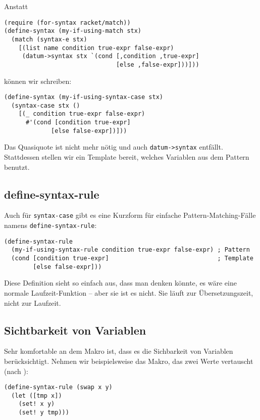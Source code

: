 Anstatt

\begin{lstlisting}
(require (for-syntax racket/match))
(define-syntax (my-if-using-match stx)
  (match (syntax-e stx)
    [(list name condition true-expr false-expr)
     (datum->syntax stx `(cond [,condition ,true-expr]
                               [else ,false-expr]))]))
\end{lstlisting}

können wir schreiben:

\begin{lstlisting}
(define-syntax (my-if-using-syntax-case stx)
  (syntax-case stx ()
    [(_ condition true-expr false-expr)
      #'(cond [condition true-expr]
             [else false-expr])]))
\end{lstlisting}

Das Quasiquote ist nicht mehr nötig und auch \texttt{datum->syntax} entfällt. Stattdessen stellen wir ein Template bereit, welches Variablen aus dem Pattern benutzt. 

\subsection{define-syntax-rule}

Auch für \texttt{syntax-case} gibt es eine Kurzform für einfache Pattern-Matching-Fälle namens \texttt{define-syntax-rule}:

\begin{lstlisting}
(define-syntax-rule 
  (my-if-using-syntax-rule condition true-expr false-expr) ; Pattern
  (cond [condition true-expr]                              ; Template
        [else false-expr]))
\end{lstlisting}

Diese Definition sieht so einfach aus, dass man denken könnte, es wäre eine normale Laufzeit-Funktion -- aber sie ist es nicht. Sie läuft zur Übersetzungszeit, nicht zur Laufzeit. 

\subsection{Sichtbarkeit von Variablen}

Sehr komfortable an dem Makro ist, dass es die Sichbarkeit von Variablen berücksichtigt. Nehmen wir beispielsweise das Makro, das zwei Werte vertauscht (nach \cite{racketguide-macros}):

\begin{lstlisting}
(define-syntax-rule (swap x y)
  (let ([tmp x])
    (set! x y)
    (set! y tmp)))
\end{lstlisting}

